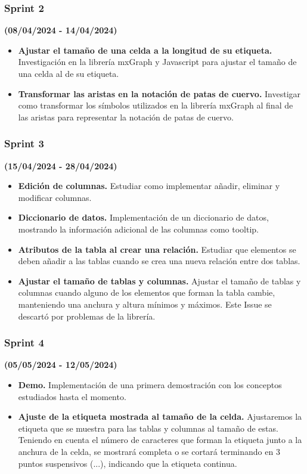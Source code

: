 \subsubsection{Sprint 2}
\textbf{(08/04/2024 - 14/04/2024)}
\begin{itemize}
    \item \textbf{Ajustar el tamaño de una celda a la longitud de su etiqueta.} Investigación en la librería mxGraph y Javascript para ajustar el tamaño de una celda al de su etiqueta.
    \item \textbf{Transformar las aristas en la notación de patas de cuervo.} Investigar como transformar los símbolos utilizados en la librería mxGraph al final de las aristas para representar la notación de patas de cuervo.
\end{itemize}

\subsubsection{Sprint 3}
\textbf{(15/04/2024 - 28/04/2024)}
\begin{itemize}
    \item \textbf{Edición de columnas.} Estudiar como implementar añadir, eliminar y modificar columnas.
    \item \textbf{Diccionario de datos.} Implementación de un diccionario de datos, mostrando la información adicional de las columnas como tooltip.
    \item \textbf{Atributos de la tabla al crear una relación.} Estudiar que elementos se deben añadir a las tablas cuando se crea una nueva relación entre dos tablas.
    \item \textbf{Ajustar el tamaño de tablas y columnas.} Ajustar el tamaño de tablas y columnas cuando alguno de los elementos que forman la tabla cambie, manteniendo una anchura y altura mínimos y máximos. Este Issue se descartó por problemas de la librería.
\end{itemize}

\subsubsection{Sprint 4}
\textbf{(05/05/2024 - 12/05/2024)}
\begin{itemize}
    \item \textbf{Demo.} Implementación de una primera demostración con los conceptos estudiados hasta el momento.
    \item \textbf{Ajuste de la etiqueta mostrada al tamaño de la celda.} Ajustaremos la etiqueta que se muestra para las tablas y columnas al tamaño de estas. Teniendo en cuenta el número de caracteres que forman la etiqueta junto a la anchura de la celda, se mostrará completa o se cortará terminando en 3 puntos suspensivos (...), indicando que la etiqueta continua.
\end{itemize}

